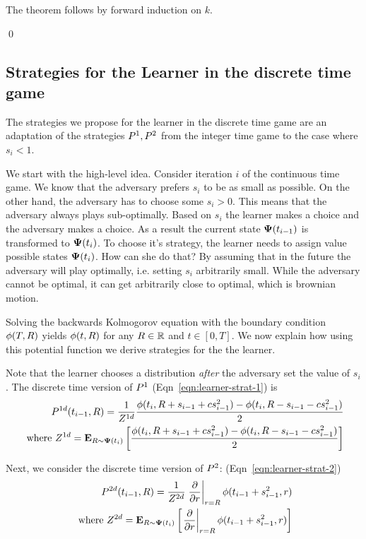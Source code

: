 \documentclass{article}[12pt]
\begin{document}
The theorem follows by forward induction on $k$.

\qed

\subsection{Strategies for the Learner in the discrete time game}
The strategies we propose for the learner in the discrete time game
are an adaptation of the strategies $P^1,P^2$ from the
integer time game to the case where $s_i<1$.

We start with the high-level idea. Consider iteration $i$ of the
continuous time game. We know that the adversary prefers $s_i$ to be
as small as possible. On the other hand, the adversary has to choose
some $s_i>0$. This means that the adversary always plays
sub-optimally. Based on $s_i$ the learner makes a choice and the
adversary makes a choice. As a result the current state ${\bf \Psi}(t_{i-1})$
is transformed to ${\bf \Psi}(t_i)$. To choose it's strategy, the learner
needs to assign value possible states ${\bf \Psi}(t_i)$. How can she do
that? By assuming that in the future the adversary will play
optimally, i.e. setting $s_i$ arbitrarily small. While the adversary
cannot be optimal, it can get arbitrarily close to optimal, which is
brownian motion.

Solving the backwards Kolmogorov equation with the boundary condition
$\phi(T,R)$ yields $\phi(t,R)$ for any
$R \in \mathbb{R}$ and $t \in [0,T]$. We now explain how using this
potential function we derive strategies for the the learner. 

Note that the learner chooses a distribution {\em after} the adversary
set the value of $s_i$. The discrete time version of $P^1$
(Eqn~\ref{eqn:learner-strat-1}) is 
\begin{eqnarray} \label{eqn:learner-strat-1c}
  P^{1d}(t_{i-1},R) = \frac{1}{Z^{1d}}
  \frac{\phi(t_i,R+s_{i-1}+cs_{i-1}^2) -
  \phi(t_i,R-s_{i-1}-cs_{i-1}^2)}{2} \\
  \mbox{ where } Z^{1d} = {\bf E}_{R \sim {\bf \Psi}(t_i)}\left[ \frac{\phi(t_i,R+s_{i-1}+cs_{i-1}^2) -
  \phi(t_i,R-s_{i-1}-cs_{i-1}^2)}{2} \right] \nonumber
\end{eqnarray}

Next, we consider the discrete time version of $P^2$:
(Eqn~\ref{eqn:learner-strat-2})
\begin{eqnarray} \label{eqn:learner-strat-2c}
  P^{2d}(t_{i-1},R) =  \frac{1}{Z^{2d}}
  \left. \frac{\partial}{\partial r} \right|_{r=R}
  \phi(t_{i-1}+s_{i-1}^2,r)
  \\
  \mbox{ where } Z^{2d} = {\bf E}_{R \sim
  {\bf \Psi}(t_i)}\left[ \left. \frac{\partial}{\partial r} \right|_{r=R} \phi(t_{i-1}+s_{i-1}^2,r) \right] \nonumber
\end{eqnarray}
\end{document}
